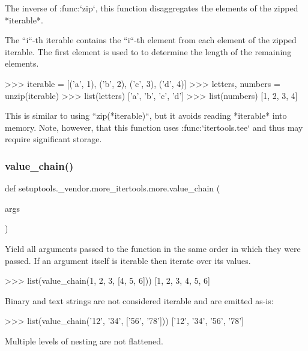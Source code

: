 \begin{DoxyVerb}The inverse of :func:`zip`, this function disaggregates the elements
of the zipped *iterable*.

The ``i``-th iterable contains the ``i``-th element from each element
of the zipped iterable. The first element is used to to determine the
length of the remaining elements.

    >>> iterable = [('a', 1), ('b', 2), ('c', 3), ('d', 4)]
    >>> letters, numbers = unzip(iterable)
    >>> list(letters)
    ['a', 'b', 'c', 'd']
    >>> list(numbers)
    [1, 2, 3, 4]

This is similar to using ``zip(*iterable)``, but it avoids reading
*iterable* into memory. Note, however, that this function uses
:func:`itertools.tee` and thus may require significant storage.\end{DoxyVerb}
 \mbox{\label{namespacesetuptools_1_1__vendor_1_1more__itertools_1_1more_a9de589597bd2e65a55e6981a2c779200}} 
\subsubsection{\texorpdfstring{value\+\_\+chain()}{value\_chain()}}
{\footnotesize\ttfamily def setuptools.\+\_\+vendor.\+more\+\_\+itertools.\+more.\+value\+\_\+chain (\begin{DoxyParamCaption}\item[{}]{args }\end{DoxyParamCaption})}

\begin{DoxyVerb}Yield all arguments passed to the function in the same order in which
they were passed. If an argument itself is iterable then iterate over its
values.

    >>> list(value_chain(1, 2, 3, [4, 5, 6]))
    [1, 2, 3, 4, 5, 6]

Binary and text strings are not considered iterable and are emitted
as-is:

    >>> list(value_chain('12', '34', ['56', '78']))
    ['12', '34', '56', '78']


Multiple levels of nesting are not flattened.\end{DoxyVerb}
 \mbox{\label{namespacesetuptools_1_1__vendor_1_1more__itertools_1_1more_a5c882dcbc34e6f2b1ea1c4397b4216a7}} 
